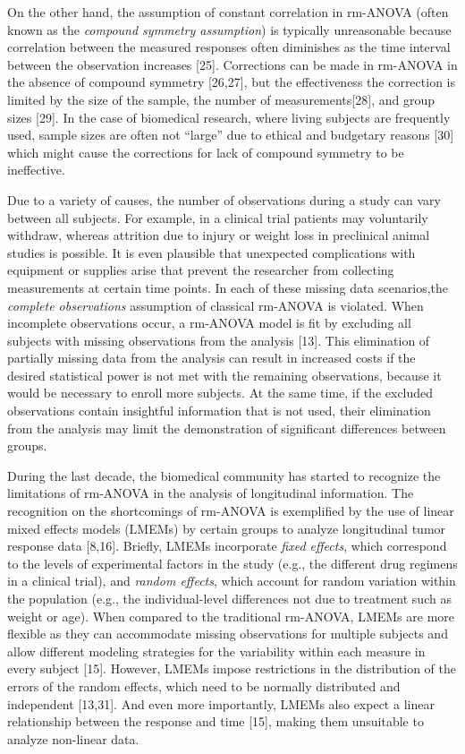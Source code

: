 \documentclass[
]{article}
\begin{document}
On the other hand, the assumption of constant correlation in rm-ANOVA (often known as the \emph{compound symmetry assumption}) is typically unreasonable because correlation between the measured responses often diminishes as the time interval between the observation increases {[}25{]}. Corrections can be made in rm-ANOVA in the absence of compound symmetry {[}26,27{]}, but the effectiveness the correction is limited by the size of the sample, the number of measurements{[}28{]}, and group sizes {[}29{]}. In the case of biomedical research, where living subjects are frequently used, sample sizes are often not ``large'' due to ethical and budgetary reasons {[}30{]} which might cause the corrections for lack of compound symmetry to be ineffective.

Due to a variety of causes, the number of observations during a study can vary between all subjects. For example, in a clinical trial patients may voluntarily withdraw, whereas attrition due to injury or weight loss in preclinical animal studies is possible. It is even plausible that unexpected complications with equipment or supplies arise that prevent the researcher from collecting measurements at certain time points. In each of these missing data scenarios,the \emph{complete observations} assumption of classical rm-ANOVA is violated. When incomplete observations occur, a rm-ANOVA model is fit by excluding all subjects with missing observations from the analysis {[}13{]}. This elimination of partially missing data from the analysis can result in increased costs if the desired statistical power is not met with the remaining observations, because it would be necessary to enroll more subjects. At the same time, if the excluded observations contain insightful information that is not used, their elimination from the analysis may limit the demonstration of significant differences between groups.

During the last decade, the biomedical community has started to recognize the limitations of rm-ANOVA in the analysis of longitudinal information. The recognition on the shortcomings of rm-ANOVA is exemplified by the use of linear mixed effects models (LMEMs) by certain groups to analyze longitudinal tumor response data {[}8,16{]}. Briefly, LMEMs incorporate \emph{fixed effects}, which correspond to the levels of experimental factors in the study (e.g., the different drug regimens in a clinical trial), and \emph{random effects}, which account for random variation within the population (e.g., the individual-level differences not due to treatment such as weight or age). When compared to the traditional rm-ANOVA, LMEMs are more flexible as they can accommodate missing observations for multiple subjects and allow different modeling strategies for the variability within each measure in every subject {[}15{]}. However, LMEMs impose restrictions in the distribution of the errors of the random effects, which need to be normally distributed and independent {[}13,31{]}. And even more importantly, LMEMs also expect a linear relationship between the response and time {[}15{]}, making them unsuitable to analyze non-linear data.
\end{document}
